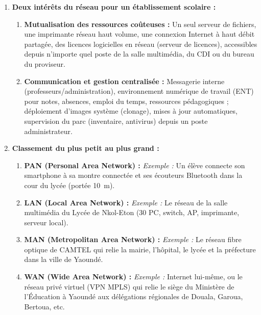 \documentclass[11pt]{article}
\newcommand{\cle}[1]{{\popxbold\color{popdark}#1}}
\begin{document}
\begin{corrige}
\begin{enumerate}
  \item \textbf{Deux intérêts du réseau pour un établissement scolaire :}
  \begin{enumerate}
    \item \textbf{Mutualisation des ressources coûteuses :} Un seul serveur de fichiers, une imprimante réseau haut volume, une connexion Internet à haut débit partagée, des licences logicielles en réseau (serveur de licences), accessibles depuis n'importe quel poste de la salle multimédia, du CDI ou du bureau du proviseur.
    \item \textbf{Communication et gestion centralisée :} Messagerie interne (professeurs/administration), environnement numérique de travail (ENT) pour notes, absences, emploi du temps, ressources pédagogiques ; déploiement d'images système (clonage), mises à jour automatiques, supervision du parc (inventaire, antivirus) depuis un poste administrateur.
  \end{enumerate}
  
  \item \textbf{Classement du plus petit au plus grand :}
  \begin{enumerate}
    \item \textbf{\cle{PAN} (Personal Area Network) :} \textit{Exemple :} Un élève connecte son smartphone à sa montre connectée et ses écouteurs Bluetooth dans la cour du lycée (portée \SI{10}{m}).
    \item \textbf{\cle{LAN} (Local Area Network) :} \textit{Exemple :} Le réseau de la salle multimédia du Lycée de Nkol-Eton (30 PC, switch, AP, imprimante, serveur local).
    \item \textbf{\cle{MAN} (Metropolitan Area Network) :} \textit{Exemple :} Le réseau fibre optique de CAMTEL qui relie la mairie, l'hôpital, le lycée et la préfecture dans la ville de Yaoundé.
    \item \textbf{\cle{WAN} (Wide Area Network) :} \textit{Exemple :} Internet lui-même, ou le réseau privé virtuel (VPN MPLS) qui relie le siège du Ministère de l'Éducation à Yaoundé aux délégations régionales de Douala, Garoua, Bertoua, etc.
  \end{enumerate}
  

\end{enumerate}
\end{corrige}
\end{document}
